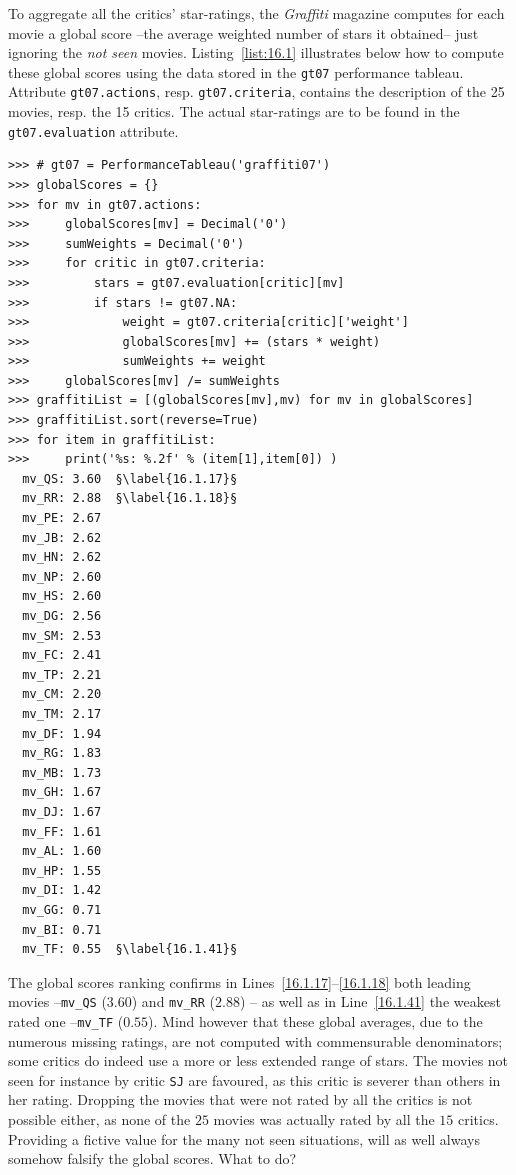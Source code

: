 To aggregate all the critics' star-ratings, the \emph{Graffiti} magazine computes for each movie a global score --the average weighted number of stars it obtained-- just ignoring the \emph{not seen} movies. Listing~\vref{list:16.1} illustrates below how to compute these global scores using the data stored in the \texttt{gt07} performance tableau. Attribute \texttt{gt07.actions}, resp. \texttt{gt07.criteria}, contains the description of the 25 movies, resp. the 15 critics. The actual star-ratings are to be found in the \texttt{gt07.evaluation} attribute.
\begin{lstlisting}[caption={Computing the average weighted number of stars per movie},label=list:16.1,basicstyle=\ttfamily\scriptsize]
>>> # gt07 = PerformanceTableau('graffiti07')
>>> globalScores = {}
>>> for mv in gt07.actions:
>>>     globalScores[mv] = Decimal('0')
>>>     sumWeights = Decimal('0')
>>>     for critic in gt07.criteria:
>>>         stars = gt07.evaluation[critic][mv]
>>>         if stars != gt07.NA:
>>>             weight = gt07.criteria[critic]['weight']
>>>             globalScores[mv] += (stars * weight)
>>>             sumWeights += weight
>>>     globalScores[mv] /= sumWeights
>>> graffitiList = [(globalScores[mv],mv) for mv in globalScores]
>>> graffitiList.sort(reverse=True)
>>> for item in graffitiList:
>>>     print('%s: %.2f' % (item[1],item[0]) )
  mv_QS: 3.60  §\label{16.1.17}§
  mv_RR: 2.88  §\label{16.1.18}§
  mv_PE: 2.67
  mv_JB: 2.62
  mv_HN: 2.62
  mv_NP: 2.60
  mv_HS: 2.60
  mv_DG: 2.56
  mv_SM: 2.53
  mv_FC: 2.41
  mv_TP: 2.21
  mv_CM: 2.20
  mv_TM: 2.17
  mv_DF: 1.94
  mv_RG: 1.83
  mv_MB: 1.73
  mv_GH: 1.67
  mv_DJ: 1.67
  mv_FF: 1.61
  mv_AL: 1.60
  mv_HP: 1.55
  mv_DI: 1.42
  mv_GG: 0.71
  mv_BI: 0.71
  mv_TF: 0.55  §\label{16.1.41}§
\end{lstlisting}

The global scores ranking confirms in Lines~\ref{16.1.17}--\ref{16.1.18} both leading movies --\texttt{mv\_QS} ($3.60$) and \texttt{mv\_RR} ($2.88$) -- as well as in Line~\ref{16.1.41} the weakest rated one --\texttt{mv\_TF} ($0.55$). Mind however that these global averages, due to the numerous missing ratings, are not computed with commensurable denominators; some critics do indeed use a more or less extended range of stars. The movies not seen for instance by critic \texttt{SJ} are favoured, as this critic is severer than others in her rating. Dropping the movies that were not rated by all the critics is not possible either, as none of the $25$ movies was actually rated by all the $15$ critics. Providing a fictive value for the many not seen situations, will as well always somehow falsify the global scores. What to do?

